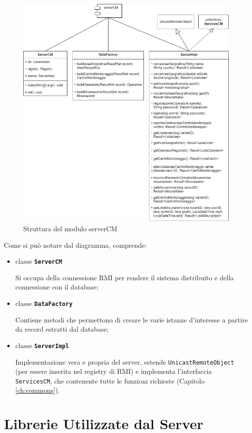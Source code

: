 \begin{figure}[h]
	\centering
	\caption{Struttura del modulo serverCM}
	\label{fig:severcm}
	\includegraphics[width=0.9\linewidth]{../../fig/img/tecnico/serverCM.drawio}
\end{figure}
\pagebreak

Come si può notare dal diagramma, comprende:
\begin{itemize}
	\item classe \textbf{\texttt{ServerCM}}
		
		Si occupa della connessione RMI per rendere il sistema distribuito e della connessione con il database;
	\item classe \textbf{\texttt{DataFactory}}
		
		Contiene metodi che permettono di creare le varie istanze d'interesse a partire da record estratti dal database;
	\item classe \textbf{\texttt{ServerImpl}}
		
		Implementazione vera e propria del server, estende \texttt{UnicastRemoteObject} (per essere inserita nel registry di RMI) e implementa l'interfaccia \texttt{ServicesCM}, che contenente tutte le funzioni richieste (Capitolo \ref{ch:commons}).
\end{itemize}

\section{Librerie Utilizzate dal Server}

